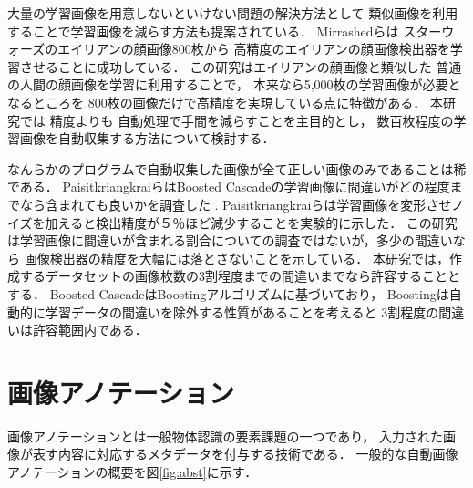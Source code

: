 \documentclass{deimj}
\begin{document}
大量の学習画像を用意しないといけない問題の解決方法として
類似画像を利用することで学習画像を減らす方法も提案されている．
Mirrashed\cite{Mirrashed_2013_ICCV}らは
スターウォーズのエイリアンの顔画像800枚から
高精度のエイリアンの顔画像検出器を学習させることに成功している．
この研究はエイリアンの顔画像と類似した
普通の人間の顔画像を学習に利用することで，
本来なら5,000枚の学習画像が必要となるところを
800枚の画像だけで高精度を実現している点に特徴がある．
本研究では
精度よりも
自動処理で手間を減らすことを主目的とし，
数百枚程度の学習画像を自動収集する方法について検討する．

なんらかのプログラムで自動収集した画像が全て正しい画像のみであることは稀である．
PaisitkriangkraiらはBoosted Cascadeの学習画像に間違いがどの程度までなら含まれても良いかを調査した
\cite{DBLP:journals/corr/abs-1009-5758}
.
Paisitkriangkraiらは学習画像を変形させノイズを加えると検出精度が５％ほど減少することを実験的に示した．
この研究は学習画像に間違いが含まれる割合についての調査ではないが，多少の間違いなら
画像検出器の精度を大幅には落とさないことを示している．
本研究では，作成するデータセットの画像枚数の3割程度までの間違いまでなら許容することとする．
Boosted CascadeはBoostingアルゴリズムに基づいており，
Boostingは自動的に学習データの間違いを除外する性質があることを考えると
3割程度の間違いは許容範囲内である．

\section{画像アノテーション}

画像アノテーションとは一般物体認識の要素課題の一つであり，
入力された画像が表す内容に対応するメタデータを付与する技術である．
一般的な自動画像アノテーションの概要を図\ref{fig:abst}に示す．
\end{document}
